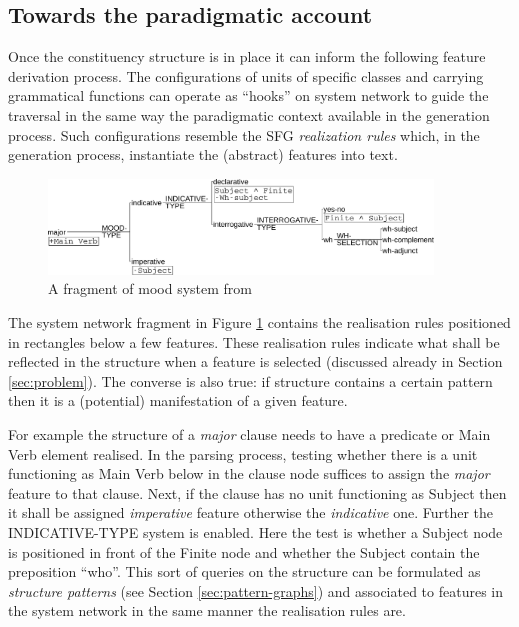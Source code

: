 \subsection{Towards the paradigmatic account}
\label{sec:paradigmatic-account}
Once the constituency structure is in place it can inform the following feature derivation process. The configurations of units of specific classes and carrying grammatical functions can operate as ``hooks'' on system network to guide the traversal in the same way the paradigmatic context available in the generation process. Such configurations resemble the SFG \textit{realization rules} which, in the generation process, instantiate the (abstract) features into text. 

\begin{figure}[!ht]
    \centering      
    \includegraphics[width=0.91\textwidth]{Figures/Example/just-mood.pdf}      
    \caption{A fragment of mood system from \citet[366]{Halliday2013}}
    \label{fig:just-mood}
\end{figure}

The system network fragment in Figure \ref{fig:just-mood} contains the realisation rules positioned in rectangles below a few features. These realisation rules indicate what shall be reflected in the structure when a feature is selected (discussed already in Section \ref{sec:problem}). The converse is also true: if structure contains a certain pattern then it is a (potential) manifestation of a given feature. 

For example the structure of a \textit{major} clause needs to have a predicate or Main Verb element realised. In the parsing process, testing whether there is a unit functioning as Main Verb below in the clause node suffices to assign the \textit{major} feature to that clause. Next, if the clause has no unit functioning as Subject then it shall be assigned \textit{imperative} feature otherwise the \textit{indicative} one. Further the INDICATIVE-TYPE system is enabled. Here the test is whether a Subject node is positioned in front of the Finite node and whether the Subject contain the preposition ``who''. This sort of queries on the structure can be formulated as \textit{structure patterns} (see Section \ref{sec:pattern-graphs}) and associated to features in the system network in the same manner the realisation rules are. 


